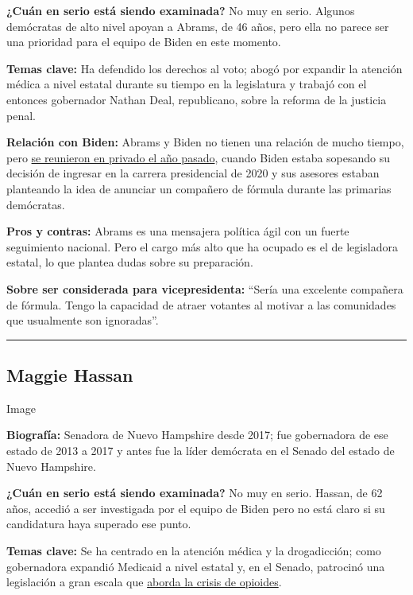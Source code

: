 \textbf{¿Cuán en serio está siendo examinada?} No muy en serio. Algunos
demócratas de alto nivel apoyan a Abrams, de 46 años, pero ella no
parece ser una prioridad para el equipo de Biden en este momento.

\textbf{Temas clave:} Ha defendido los derechos al voto; abogó por
expandir la atención médica a nivel estatal durante su tiempo en la
legislatura y trabajó con el entonces gobernador Nathan Deal,
republicano, sobre la reforma de la justicia penal.

\textbf{Relación con Biden:} Abrams y Biden no tienen una relación de
mucho tiempo, pero
\href{https://www.nytimes3xbfgragh.onion/2019/03/21/us/politics/joe-biden-2020-election.html}{se
reunieron en privado el año pasado}, cuando Biden estaba sopesando su
decisión de ingresar en la carrera presidencial de 2020 y sus asesores
estaban planteando la idea de anunciar un compañero de fórmula durante
las primarias demócratas.

\textbf{Pros y contras:} Abrams es una mensajera política ágil con un
fuerte seguimiento nacional. Pero el cargo más alto que ha ocupado es el
de legisladora estatal, lo que plantea dudas sobre su preparación.

\textbf{Sobre ser considerada para vicepresidenta:} ``Sería una
excelente compañera de fórmula. Tengo la capacidad de atraer votantes al
motivar a las comunidades que usualmente son ignoradas''.

\begin{center}\rule{0.5\linewidth}{\linethickness}\end{center}

\hypertarget{maggie-hassan}{%
\subsection{Maggie Hassan}\label{maggie-hassan}}

Image

\textbf{Biografía:} Senadora de Nuevo Hampshire desde 2017; fue
gobernadora de ese estado de 2013 a 2017 y antes fue la líder demócrata
en el Senado del estado de Nuevo Hampshire.

\textbf{¿Cuán en serio está siendo examinada?} No muy en serio. Hassan,
de 62 años, accedió a ser investigada por el equipo de Biden pero no
está claro si su candidatura haya superado ese punto.

\textbf{Temas clave:} Se ha centrado en la atención médica y la
drogadicción; como gobernadora expandió Medicaid a nivel estatal y, en
el Senado, patrocinó una legislación a gran escala que
\href{https://www.nytimes3xbfgragh.onion/2018/03/19/us/politics/trump-new-hampshire-opioid-plan.html}{aborda
la crisis de opioides}.

